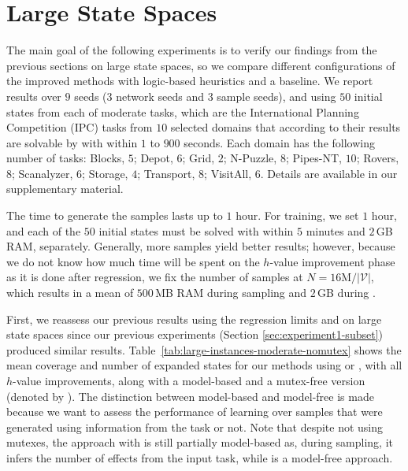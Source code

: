 

\section{Large State Spaces}
\label{sec:experiment2}

The main goal of the following experiments is to verify our findings from the previous sections on large state spaces, so we compare different configurations of the improved methods with logic-based heuristics and a baseline. We report results over $9$ seeds ($3$ network seeds and $3$ sample seeds), and using $50$ initial states from each of \citeyear{Ferber.etal/2022} moderate tasks, which are the International Planning Competition (IPC) tasks from $10$ selected domains that according to their results are solvable by \gbfs with \hff within $1$ to $900$ seconds. Each domain has the following number of tasks: Blocks, $5$; Depot, $6$; Grid, $2$; N-Puzzle, $8$; Pipes-NT, $10$; Rovers, $8$; Scanalyzer, $6$; Storage, $4$; Transport, $8$; VisitAll, $6$. Details are available in our supplementary material.

The time to generate the samples lasts up to $1$ hour. For training, we set $1$ hour, and each of the $50$ initial states must be solved with \gbfs within $5$ minutes and $2$\,GB RAM, separately. Generally, more samples yield better results; however, because we do not know how much time will be spent on the $h$-value improvement \hvfc phase as it is done after regression, we fix the number of samples at $N = 16\text{M} / |\mathcal{V}|$, which results in a mean of $500$\,MB RAM during sampling and $2$\,GB during \hvfc.

First, we reassess our previous results using the regression limits \facts and \meanfx on large state spaces since our previous experiments (Section \ref{sec:experiment1-subset}) produced similar results. Table~\ref{tab:large-instances-moderate-nomutex} shows the mean coverage and number of expanded states for our methods using \facts or \meanfx, with all $h$-value improvements, along with a model-based and a mutex-free version (denoted by \hnnnomutex). The distinction between model-based and model-free is made because we want to assess the performance of learning over samples that were generated using information from the task or not. Note that despite not using mutexes, the approach with \hnnnomutexl{\meanfx} is still partially model-based as, during sampling, it infers the number of effects from the input task, while \hnnnomutexl{\facts} is a model-free approach.

